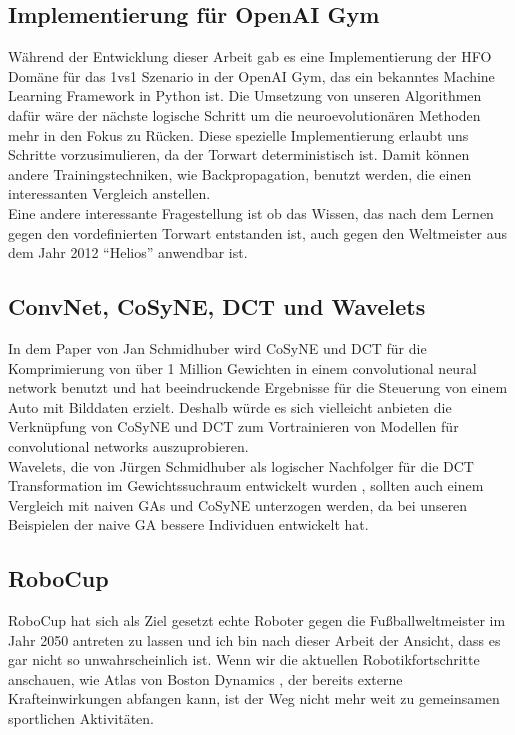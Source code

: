         \subsection*{Implementierung für OpenAI Gym}
            Während der Entwicklung dieser Arbeit gab es eine Implementierung der HFO Domäne für das 1vs1 Szenario in der OpenAI Gym, das ein bekanntes Machine Learning Framework in Python ist. Die Umsetzung von unseren Algorithmen dafür wäre der nächste logische Schritt um die neuroevolutionären Methoden mehr in den Fokus zu Rücken. Diese spezielle Implementierung erlaubt uns Schritte vorzusimulieren, da der Torwart deterministisch ist. Damit können andere Trainingstechniken, wie Backpropagation, benutzt werden, die einen interessanten Vergleich anstellen.\\

            \noindent
            Eine andere interessante Fragestellung ist ob das Wissen, das nach dem Lernen gegen den vordefinierten Torwart entstanden ist, auch gegen den Weltmeister aus dem Jahr 2012 ``Helios'' anwendbar ist.


        \subsection*{ConvNet, CoSyNE, DCT und Wavelets}
            In dem Paper von Jan Schmidhuber \cite{cosyne4} wird CoSyNE und DCT für die Komprimierung von über 1 Million Gewichten in einem convolutional neural network benutzt und hat beeindruckende Ergebnisse für die Steuerung von einem Auto mit Bilddaten erzielt. Deshalb würde es sich vielleicht anbieten die Verknüpfung von CoSyNE und DCT zum Vortrainieren von Modellen für convolutional networks auszuprobieren. \\

            \noindent
            Wavelets, die von Jürgen Schmidhuber als logischer Nachfolger für die DCT Transformation im Gewichtssuchraum entwickelt wurden \cite{wavelet}, sollten auch einem Vergleich mit naiven GAs und CoSyNE unterzogen werden, da bei unseren Beispielen der naive GA bessere Individuen entwickelt hat.

        \subsection*{RoboCup}
            RoboCup hat sich als Ziel gesetzt echte Roboter gegen die Fußballweltmeister im Jahr 2050 antreten zu lassen und ich bin nach dieser Arbeit der Ansicht, dass es gar nicht so unwahrscheinlich ist. Wenn wir die aktuellen Robotikfortschritte anschauen, wie Atlas von Boston Dynamics \cite{robot}, der bereits externe Krafteinwirkungen abfangen kann, ist der Weg nicht mehr weit zu gemeinsamen sportlichen Aktivitäten.\\

